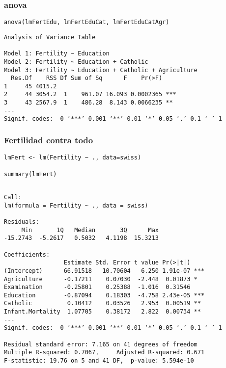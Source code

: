 \documentclass[bigger]{beamer}
\begin{document}
\begin{frame}[fragile]
\frametitle{anova}
\label{sec-3-8}


\lstset{language=R}
\begin{lstlisting}
anova(lmFertEdu, lmFertEduCat, lmFertEduCatAgr)
\end{lstlisting}


\begin{verbatim}
Analysis of Variance Table

Model 1: Fertility ~ Education
Model 2: Fertility ~ Education + Catholic
Model 3: Fertility ~ Education + Catholic + Agriculture
  Res.Df    RSS Df Sum of Sq      F    Pr(>F)    
1     45 4015.2                                  
2     44 3054.2  1    961.07 16.093 0.0002365 ***
3     43 2567.9  1    486.28  8.143 0.0066235 ** 
---
Signif. codes:  0 ‘***’ 0.001 ‘**’ 0.01 ‘*’ 0.05 ‘.’ 0.1 ‘ ’ 1
\end{verbatim}
\end{frame}
\begin{frame}[fragile]
\frametitle{Fertilidad contra todo}
\label{sec-3-9}


\lstset{language=R}
\begin{lstlisting}
lmFert <- lm(Fertility ~ ., data=swiss)

summary(lmFert)
\end{lstlisting}


\begin{verbatim}

Call:
lm(formula = Fertility ~ ., data = swiss)

Residuals:
     Min       1Q   Median       3Q      Max 
-15.2743  -5.2617   0.5032   4.1198  15.3213 

Coefficients:
                 Estimate Std. Error t value Pr(>|t|)    
(Intercept)      66.91518   10.70604   6.250 1.91e-07 ***
Agriculture      -0.17211    0.07030  -2.448  0.01873 *  
Examination      -0.25801    0.25388  -1.016  0.31546    
Education        -0.87094    0.18303  -4.758 2.43e-05 ***
Catholic          0.10412    0.03526   2.953  0.00519 ** 
Infant.Mortality  1.07705    0.38172   2.822  0.00734 ** 
---
Signif. codes:  0 ‘***’ 0.001 ‘**’ 0.01 ‘*’ 0.05 ‘.’ 0.1 ‘ ’ 1 

Residual standard error: 7.165 on 41 degrees of freedom
Multiple R-squared: 0.7067,     Adjusted R-squared: 0.671 
F-statistic: 19.76 on 5 and 41 DF,  p-value: 5.594e-10
\end{verbatim}
\end{frame}
\end{document}
